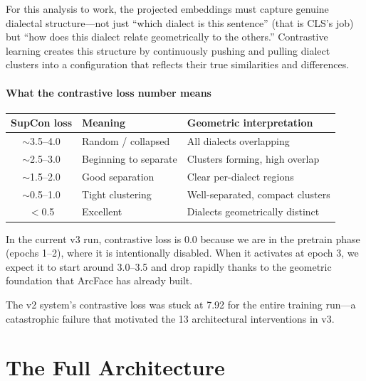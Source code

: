 \documentclass[11pt,a4paper]{article}
\theoremstyle{definition}
\begin{document}
For this analysis to work, the projected embeddings must capture
genuine dialectal structure---not just ``which dialect is this
sentence'' (that is CLS's job) but ``how does this dialect relate
geometrically to the others.'' Contrastive learning creates this
structure by continuously pushing and pulling dialect clusters into a
configuration that reflects their true similarities and differences.

\subsection{What the contrastive loss number means}

\begin{center}
\begin{tabular}{cll}
\toprule
\textbf{SupCon loss} & \textbf{Meaning} & \textbf{Geometric interpretation} \\
\midrule
$\sim$3.5--4.0 & Random / collapsed & All dialects overlapping \\
$\sim$2.5--3.0 & Beginning to separate & Clusters forming, high overlap \\
$\sim$1.5--2.0 & Good separation & Clear per-dialect regions \\
$\sim$0.5--1.0 & Tight clustering & Well-separated, compact clusters \\
$<$0.5 & Excellent & Dialects geometrically distinct \\
\bottomrule
\end{tabular}
\end{center}

In the current v3 run, contrastive loss is 0.0 because we are in the
pretrain phase (epochs 1--2), where it is intentionally disabled. When
it activates at epoch 3, we expect it to start around 3.0--3.5 and
drop rapidly thanks to the geometric foundation that ArcFace has
already built.

The v2 system's contrastive loss was stuck at 7.92 for the entire
training run---a catastrophic failure that motivated the 13
architectural interventions in v3.

\newpage
\part{The Full Architecture}

\end{document}
